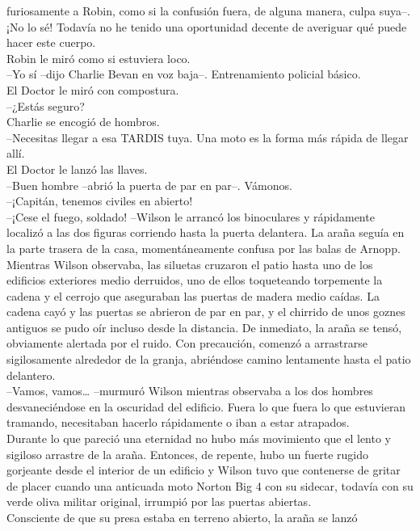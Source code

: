 furiosamente a Robin, como si la confusión fuera, de alguna manera,
culpa suya--. ¡No lo sé! Todavía no he tenido una oportunidad decente de
averiguar qué puede hacer este cuerpo.\\
Robin le miró como si estuviera loco.\\
--Yo sí --dijo Charlie Bevan en voz baja--. Entrenamiento policial
básico.\\
El Doctor le miró con compostura.\\
--¿Estás seguro?\\
Charlie se encogió de hombros.\\
--Necesitas llegar a esa TARDIS tuya. Una moto es la forma más rápida de
llegar allí.\\
El Doctor le lanzó las llaves.\\
--Buen hombre --abrió la puerta de par en par--.
Vámonos.\\[2\baselineskip]--¡Capitán, tenemos civiles en abierto!\\
--¡Cese el fuego, soldado! --Wilson le arrancó los binoculares y
rápidamente localizó a las dos figuras corriendo hasta la puerta
delantera. La araña seguía en la parte trasera de la casa,
momentáneamente confusa por las balas de Arnopp.\\
Mientras Wilson observaba, las siluetas cruzaron el patio hasta uno de
los edificios exteriores medio derruidos, uno de ellos toqueteando
torpemente la cadena y el cerrojo que aseguraban las puertas de madera
medio caídas. La cadena cayó y las puertas se abrieron de par en par, y
el chirrido de unos goznes antiguos se pudo oír incluso desde la
distancia. De inmediato, la araña se tensó, obviamente alertada por el
ruido. Con precaución, comenzó a arrastrarse sigilosamente alrededor de
la granja, abriéndose camino lentamente hasta el patio delantero.\\
--Vamos, vamos\ldots{} --murmuró Wilson mientras observaba a los dos
hombres desvaneciéndose en la oscuridad del edificio. Fuera lo que fuera
lo que estuvieran tramando, necesitaban hacerlo rápidamente o iban a
estar atrapados.\\
Durante lo que pareció una eternidad no hubo más movimiento que el lento
y sigiloso arrastre de la araña. Entonces, de repente, hubo un fuerte
rugido gorjeante desde el interior de un edificio y Wilson tuvo que
contenerse de gritar de placer cuando una anticuada moto Norton Big 4
con su sidecar, todavía con su verde oliva militar original, irrumpió
por las puertas abiertas.\\
Consciente de que su presa estaba en terreno abierto, la araña se lanzó
